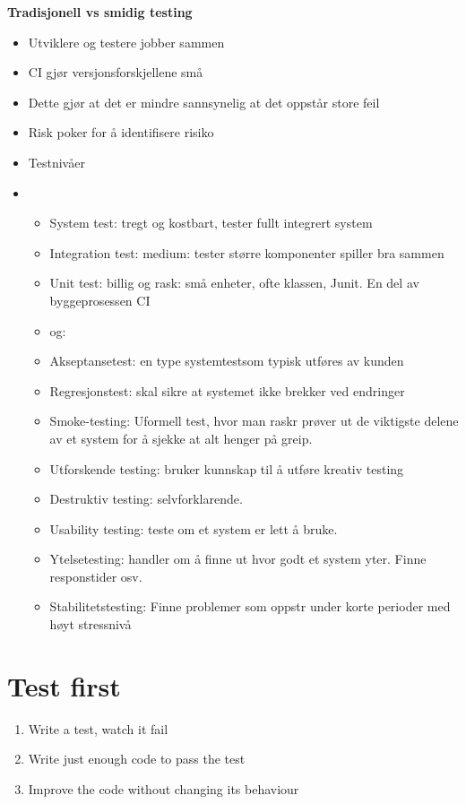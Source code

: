 \documentclass{article}
\begin{document}
\begin{flushleft}
        \bigskip
        \textbf{Tradisjonell vs smidig testing}
        \begin{itemize}
            \item Utviklere og testere jobber sammen
            \item CI gjør versjonsforskjellene små
            \item Dette gjør at det er mindre sannsynelig at det oppstår store feil
            \item Risk poker for å identifisere risiko
            \item Testnivåer
            \item \begin{itemize}
                \item System test: tregt og kostbart, tester fullt integrert system
                \item Integration test: medium: tester større komponenter spiller bra sammen
                \item Unit test: billig og rask: små enheter, ofte klassen, Junit. En del av byggeprosessen CI
                \item og:
                \item Akseptansetest: en type systemtestsom typisk utføres av kunden
                \item Regresjonstest: skal sikre at systemet ikke brekker ved endringer
                \item Smoke-testing: Uformell test, hvor man raskr prøver ut de viktigste delene av et system for å sjekke at alt henger på greip.
                \item Utforskende testing: bruker kunnskap til å utføre kreativ testing
                \item Destruktiv testing: selvforklarende.
                \item Usability testing: teste om et system er lett å bruke. 
                \item Ytelsetesting: handler om å finne ut hvor godt et system yter. Finne responstider osv.
                \item Stabilitetstesting: Finne problemer som oppstr under korte perioder med høyt stressnivå
            \end{itemize}
        \end{itemize}

        \section{Test first}
        \begin{enumerate}
            \item Write a test, watch it fail
            \item Write just enough code to pass the test
            \item Improve the code without changing its behaviour
        \end{enumerate}


\end{flushleft}
\end{document}
